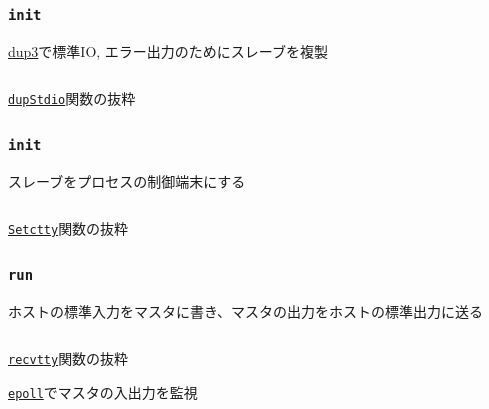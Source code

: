 \documentclass[unicode, 14pt, aspectratio=169]{beamer}
\begin{document}
\begin{frame}
  \frametitle{\texttt{init}}
  \href{https://ja.manpages.org/dup3/2}{dup3}で標準IO, エラー出力のためにスレーブを複製
  \begin{center}
    \inputminted{go}{code/pty_init_dup.go}
    \href{https://github.com/opencontainers/runc/blob/7cb363254b69e10320360b63fb73e0ffb5da7bf2/libcontainer/console_linux.go\#L28}{\texttt{dupStdio}}関数の抜粋
  \end{center}
\end{frame}
\begin{frame}
  \frametitle{\texttt{init}}
  スレーブをプロセスの制御端末にする\supercite{ioctl}
  \begin{center}
    \inputminted{go}{code/pty_tty.go}
    \href{https://github.com/opencontainers/runc/blob/7cb363254b69e10320360b63fb73e0ffb5da7bf2/libcontainer/system/linux.go\#L121}{\texttt{Setctty}}関数の抜粋
  \end{center}
\end{frame}
\begin{frame}
  \frametitle{\texttt{run}}
  ホストの標準入力をマスタに書き、マスタの出力をホストの標準出力に送る
  \begin{center}
    \inputminted{go}{code/tty_run.go}
    \href{https://github.com/opencontainers/runc/blob/7cb363254b69e10320360b63fb73e0ffb5da7bf2/tty.go\#L102}{\texttt{recvtty}}関数の抜粋
  \end{center}
  \href{https://man7.org/linux/man-pages/man7/epoll.7.html}{\texttt{epoll}}でマスタの入出力を監視
\end{frame}
\end{document}
